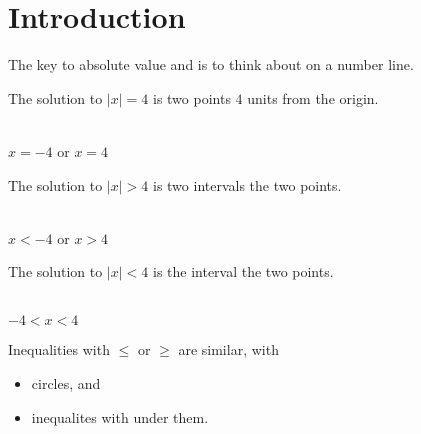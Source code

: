 \section{Introduction}

The key to absolute value  and  is to think about  on a number line.

\begin{tcolorbox}[center,colback=white,boxrule=1pt,]
    The solution to 
    {
        \large
        $|x| = 4$
    }
    is two points  $4$ units from the origin.
    \begin{center}
        \\
        $x=-4$ \quad or \quad $x=4$ 
    \end{center}
\end{tcolorbox}


\begin{tcolorbox}[center,colback=white,boxrule=1pt,]
    The solution to 
    {
        \large
        $|x| > 4$
    }
    is two intervals  the two points.
    \begin{center}
        \\
        $x<-4$ \quad or \quad $x>4$ 
    \end{center}
\end{tcolorbox}


\begin{tcolorbox}[center,colback=white,boxrule=1pt,]
    The solution to 
    {
        \large
        $|x| < 4$
     } 
    is the interval  the two points.
    \begin{center}
        \\
        $-4 < x < 4$
    \end{center}
\end{tcolorbox}

\vfill
Inequalities with {\large$\le$} or {\large$\ge$} are {similar}, with 
\begin{itemize}[topsep=0in]
    \item {}  circles, and 
    \item inequalites with   under them.
\end{itemize}
